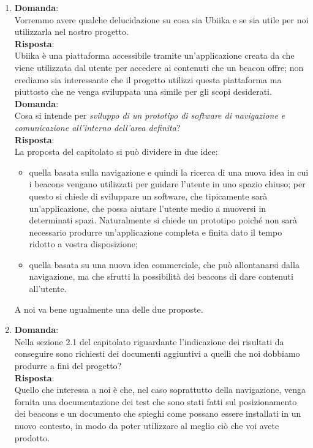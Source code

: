 \documentclass[a4paper,titlepage]{article}
\begin{document}
\begin{enumerate}
  \item \textbf{Domanda}: \\
  Vorremmo avere qualche delucidazione su cosa sia Ubiika e se sia utile per noi utilizzarla nel nostro progetto. \\
  \textbf{Risposta}: \\
  Ubiika è una piattaforma accessibile tramite un'applicazione creata da \PROPONENTE {} che viene utilizzata dal utente per accedere ai contenuti che un beacon offre; non crediamo sia interessante che il progetto utilizzi questa piattaforma ma piuttosto che ne venga sviluppata una simile per gli scopi desiderati.\\
  \textbf{Domanda}: \\
  Cosa si intende per \textit{sviluppo di un prototipo di software di navigazione e comunicazione all’interno dell’area definita}?\\
  \textbf{Risposta}: \\
  La proposta del capitolato si può dividere in due idee:
  \begin{itemize}
  	\item quella basata sulla navigazione e quindi la ricerca di una nuova idea in cui i beacons vengano utilizzati per guidare l'utente in uno spazio chiuso; per questo si chiede di sviluppare un software, che tipicamente sarà un'applicazione, che possa aiutare l'utente medio a muoversi in determinati spazi. Naturalmente si chiede un prototipo poiché non sarà necessario produrre un'applicazione completa e finita dato il tempo ridotto a vostra disposizione;
  	\item quella basata su una nuova idea commerciale, che può allontanarsi dalla navigazione, ma che sfrutti la possibilità dei beacons di dare contenuti all'utente.
  \end{itemize}
  A noi va bene ugualmente una delle due proposte.
  \item \textbf{Domanda}:\\
  Nella sezione 2.1 del capitolato riguardante l'indicazione dei risultati da conseguire sono richiesti dei documenti aggiuntivi a quelli che noi dobbiamo produrre a fini del progetto?\\
  \textbf{Risposta}: \\ 
  Quello che interessa a noi è che, nel caso soprattutto della navigazione, venga fornita una documentazione dei test che sono stati fatti sul posizionamento dei beacons e un documento che spieghi come possano essere installati in un nuovo contesto, in modo da poter utilizzare al meglio ciò che voi avete prodotto.

\end{enumerate}
\end{document}
